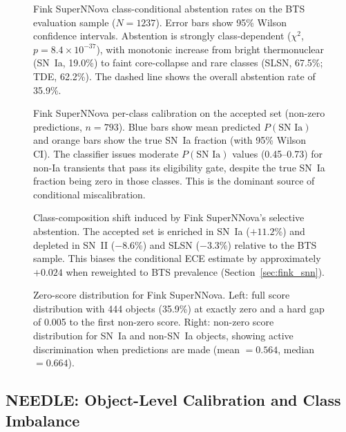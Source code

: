 \documentclass[twocolumn]{aastex631}
\begin{document}
\begin{figure}
\caption{Fink SuperNNova class-conditional abstention rates on the BTS evaluation sample ($N = 1237$). Error bars show 95\% Wilson confidence intervals. Abstention is strongly class-dependent ($\chi^2$, $p = 8.4 \times 10^{-37}$), with monotonic increase from bright thermonuclear (SN~Ia, 19.0\%) to faint core-collapse and rare classes (SLSN, 67.5\%; TDE, 62.2\%). The dashed line shows the overall abstention rate of 35.9\%. \label{fig:fink_snn_zerofrac}}
\end{figure}

\begin{figure}
\caption{Fink SuperNNova per-class calibration on the accepted set (non-zero predictions, $n = 793$). Blue bars show mean predicted $P(\text{SN~Ia})$ and orange bars show the true SN~Ia fraction (with 95\% Wilson CI). The classifier issues moderate $P(\text{SN~Ia})$ values (0.45--0.73) for non-Ia transients that pass its eligibility gate, despite the true SN~Ia fraction being zero in those classes. This is the dominant source of conditional miscalibration. \label{fig:fink_snn_perclass}}
\end{figure}

\begin{figure}
\caption{Class-composition shift induced by Fink SuperNNova's selective abstention. The accepted set is enriched in SN~Ia ($+11.2$\%) and depleted in SN~II ($-8.6$\%) and SLSN ($-3.3$\%) relative to the BTS sample. This biases the conditional ECE estimate by approximately $+0.024$ when reweighted to BTS prevalence (Section~\ref{sec:fink_snn}). \label{fig:fink_snn_compshift}}
\end{figure}

\begin{figure}
\caption{Zero-score distribution for Fink SuperNNova. Left: full score distribution with 444 objects (35.9\%) at exactly zero and a hard gap of 0.005 to the first non-zero score. Right: non-zero score distribution for SN~Ia and non-SN~Ia objects, showing active discrimination when predictions are made (mean $= 0.564$, median $= 0.664$). \label{fig:fink_snn_hist}}
\end{figure}


\subsection{NEEDLE: Object-Level Calibration and Class Imbalance} \label{sec:needle}
\end{document}
